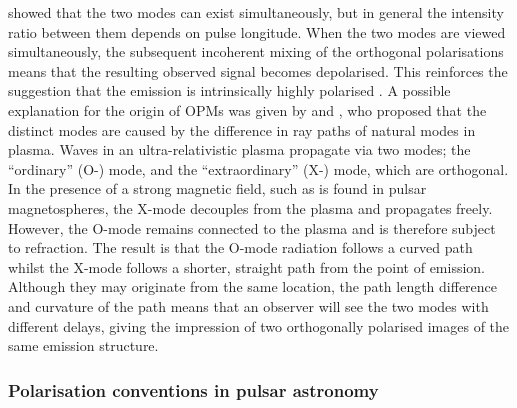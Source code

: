 \citet{MSxx2000} showed that the two modes can exist simultaneously, but in general the intensity ratio between them depends on pulse longitude. When the two modes are viewed simultaneously, the subsequent incoherent mixing of the orthogonal polarisations means that the resulting observed signal becomes depolarised. This reinforces the suggestion that the emission is intrinsically highly polarised \citep[e.g.][]{BRxx1980,SCR+1984, MSxx1998}. A possible explanation for the origin of OPMs was given by \citet{Mxxx1979} and \citet{ABxx1986}, who proposed that the distinct modes are caused by the difference in ray paths of natural modes in plasma. Waves in an ultra-relativistic plasma propagate via two modes; the ``ordinary'' (O-) mode, and the ``extraordinary'' (X-) mode, which are orthogonal. In the presence of a strong magnetic field, such as is found in pulsar magnetospheres, the X-mode decouples from the plasma and propagates freely. However, the O-mode remains connected to the plasma and is therefore subject to refraction. The result is that the O-mode radiation follows a curved path whilst the X-mode follows a shorter, straight path from the point of emission. Although they may originate from the same location, the path length difference and curvature of the path means that an observer will see the two modes with different delays, giving the impression of two orthogonally polarised images of the same emission structure.

\subsubsection*{Polarisation conventions in pulsar astronomy}
\label{sec: intro - emission models - polarisation - conventions}

